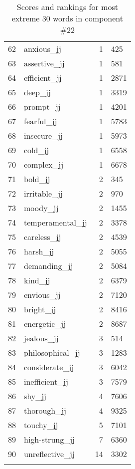 \begin{longtable}[!htbp]{| rlr@{.}l |}
    62 & anxious\_jj & 1 & 425 \\
    63 & assertive\_jj & 1 & 581 \\
    64 & efficient\_jj & 1 & 2871 \\
    65 & deep\_jj & 1 & 3319 \\
    66 & prompt\_jj & 1 & 4201 \\
    67 & fearful\_jj & 1 & 5783 \\
    68 & insecure\_jj & 1 & 5973 \\
    69 & cold\_jj & 1 & 6558 \\
    70 & complex\_jj & 1 & 6678 \\
    71 & bold\_jj & 2 & 345 \\
    72 & irritable\_jj & 2 & 970 \\
    73 & moody\_jj & 2 & 1455 \\
    74 & temperamental\_jj & 2 & 3378 \\
    75 & careless\_jj & 2 & 4539 \\
    76 & harsh\_jj & 2 & 5055 \\
    77 & demanding\_jj & 2 & 5084 \\
    78 & kind\_jj & 2 & 6379 \\
    79 & envious\_jj & 2 & 7120 \\
    80 & bright\_jj & 2 & 8416 \\
    81 & energetic\_jj & 2 & 8687 \\
    82 & jealous\_jj & 3 & 514 \\
    83 & philosophical\_jj & 3 & 1283 \\
    84 & considerate\_jj & 3 & 6042 \\
    85 & inefficient\_jj & 3 & 7579 \\
    86 & shy\_jj & 4 & 7606 \\
    87 & thorough\_jj & 4 & 9325 \\
    88 & touchy\_jj & 5 & 7101 \\
    89 & high-strung\_jj & 7 & 6360 \\
    90 & unreflective\_jj & 14 & 3302 \\
    \hline
    \caption{Scores and rankings for most extreme 30 words in component \#22} \\
\end{longtable}
